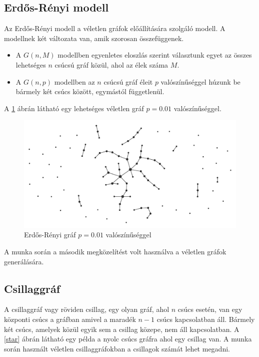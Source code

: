 \documentclass[12pt]{report}
\begin{document}
\pagebreak

\subsection{Erdős-Rényi modell}

Az Erdős-Rényi modell \cite{erdos59a} a véletlen gráfok előállítására szolgáló modell.
A modellnek két változata van, amik szorosan összefüggenek.
\begin{itemize}
	\item A \(G(n, M)\) modellben egyenletes eloszlás szerint választunk egyet az összes lehetséges \(n\) csúcsú gráf közül, ahol az élek száma \(M\).
	\item A \(G(n, p)\) modellben az \(n\) csúcsú gráf éleit \(p\) valószínűséggel húzunk be bármely két csúcs között, egymástól függetlenül.
\end{itemize}

A \ref{erdos} ábrán látható egy lehetséges véletlen gráf \(p=0.01\) valószínűséggel.

\begin{figure}[H]
	\begin{center}
		\includegraphics[width=0.9\linewidth]{pictures/Erdos_generated_network-p001.jpg}
		\caption{Erdős-Rényi gráf \(p=0.01\) valószínűséggel \cite{wikipedia_erdos}}
		\label{erdos}
	\end{center}
\end{figure}

A munka során a második megközelítést volt használva a véletlen gráfok generálására.

\subsection{Csillaggráf}

A csillaggráf vagy röviden csillag, egy olyan gráf, ahol \(n\) csúcs esetén, van egy központi csúcs a gráfban amivel a maradék \(n-1\) csúcs kapcsolatban áll.
Bármely két csúcs, amelyek közül egyik sem a csillag közepe, nem áll kapcsolatban.
A \ref{star} ábrán látható egy példa a nyolc csúcs gráfra ahol egy csillag van.
A munka során használt véletlen csillaggráfokban a csillagok számát lehet megadni.
\end{document}
